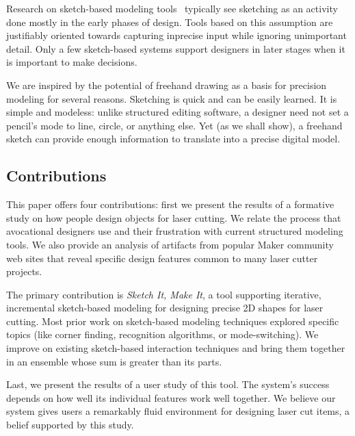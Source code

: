 \documentclass{article}
\begin{document}
Research on sketch-based modeling tools~\cite{johnson-sketch-review}
typically see sketching as an activity done mostly in the early phases
of design. Tools based on this assumption are justifiably oriented
towards capturing inprecise input while ignoring unimportant
detail. Only a few sketch-based systems support designers in later
stages when it is important to make decisions.


We are inspired by the potential of freehand drawing as a basis for
precision modeling for several reasons. Sketching is quick and can be
easily learned. It is simple and modeless: unlike structured editing
software, a designer need not set a pencil's mode to line, circle, or
anything else. Yet (as we shall show), a freehand sketch can provide
enough information to translate into a precise digital model.

\subsection{Contributions}

This paper offers four contributions: first we present the results of
a formative study on how people design objects for laser cutting. We
relate the process that avocational designers use and their
frustration with current structured modeling tools. We also provide an
analysis of artifacts from popular Maker community web sites that
reveal specific design features common to many laser cutter projects.

The primary contribution is \textit{Sketch It, Make It}, a tool
supporting iterative, incremental sketch-based modeling for designing
precise 2D shapes for laser cutting. Most prior work on sketch-based
modeling techniques explored specific topics (like corner finding,
recognition algorithms, or mode-switching). We improve on existing
sketch-based interaction techniques and bring them together in an
ensemble whose sum is greater than its parts. 

Last, we present the results of a user study of this tool. The
system's success depends on how well its individual features work well
together. We believe our system gives users a remarkably fluid
environment for designing laser cut items, a belief supported by this
study.
\end{document}

